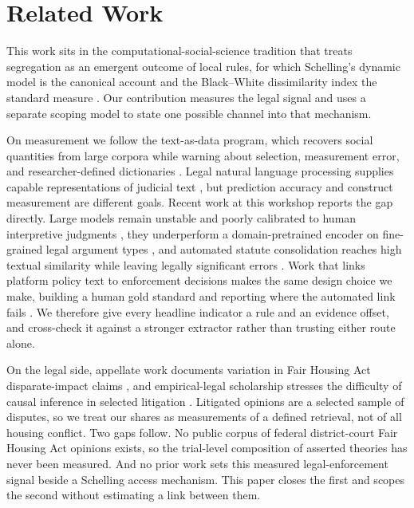 \documentclass[11pt]{article}
\begin{document}
\section{Related Work}

This work sits in the computational-social-science tradition that treats segregation as an emergent outcome of local rules, for which Schelling's dynamic model is the canonical account \citep{schelling1971} and the Black--White dissimilarity index the standard measure \citep{massey1988}. Our contribution measures the legal signal and uses a separate scoping model to state one possible channel into that mechanism.

On measurement we follow the text-as-data program, which recovers social quantities from large corpora while warning about selection, measurement error, and researcher-defined dictionaries \citep{grimmer2013}. Legal natural language processing supplies capable representations of judicial text \citep{chalkidis2019,chalkidis2020,guha2023}, but prediction accuracy and construct measurement are different goals. Recent work at this workshop reports the gap directly. Large models remain unstable and poorly calibrated to human interpretive judgments \citep{purushothama2025}, they underperform a domain-pretrained encoder on fine-grained legal argument types \citep{held2025}, and automated statute consolidation reaches high textual similarity while leaving legally significant errors \citep{prior2025}. Work that links platform policy text to enforcement decisions makes the same design choice we make, building a human gold standard and reporting where the automated link fails \citep{esser2025}. We therefore give every headline indicator a rule and an evidence offset, and cross-check it against a stronger extractor rather than trusting either route alone.

On the legal side, appellate work documents variation in Fair Housing Act disparate-impact claims \citep{seicshnaydre2013}, and empirical-legal scholarship stresses the difficulty of causal inference in selected litigation \citep{ho2011,priest1984}. Litigated opinions are a selected sample of disputes, so we treat our shares as measurements of a defined retrieval, not of all housing conflict. Two gaps follow. No public corpus of federal district-court Fair Housing Act opinions exists, so the trial-level composition of asserted theories has never been measured. And no prior work sets this measured legal-enforcement signal beside a Schelling access mechanism. This paper closes the first and scopes the second without estimating a link between them.
\end{document}
